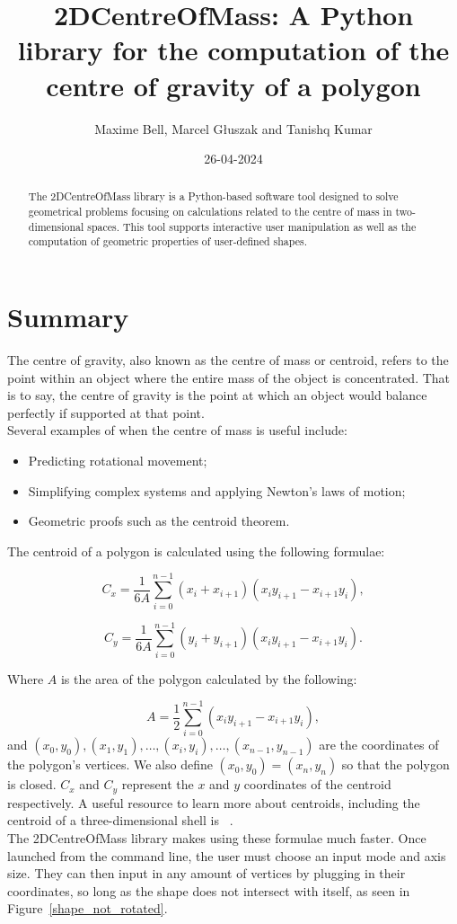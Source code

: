 \documentclass{article}
\title{2DCentreOfMass: A Python library for the computation of the centre of gravity of a polygon}
\author{Maxime Bell, Marcel Głuszak and Tanishq Kumar}
\date{26-04-2024}
\begin{document}
\maketitle

\begin{abstract}
    The 2DCentreOfMass library is a Python-based software tool designed to solve geometrical problems focusing on calculations related to the centre of mass in two-dimensional spaces. This tool supports interactive user manipulation as well as the computation of geometric properties of user-defined shapes. 
\end{abstract}

\section{Summary}
The centre of gravity, also known as the centre of mass or centroid, refers to the point within an object where the entire mass of the object is concentrated. That is to say, the centre of gravity is the point at which an object would balance perfectly if supported at that point.\\
Several examples of when the centre of mass is useful include:

\begin{itemize}
    \item Predicting rotational movement;
    \item Simplifying complex systems and applying Newton's laws of motion;
    \item Geometric proofs such as the centroid theorem.
\end{itemize}

The centroid of a polygon is calculated using the following formulae:

\[
C_x = \frac{1}{6A} \sum_{i=0}^{n-1} (x_i + x_{i+1})(x_i y_{i+1} - x_{i+1} y_i),
\]

\[
C_y = \frac{1}{6A} \sum_{i=0}^{n-1} (y_i + y_{i+1})(x_i y_{i+1} - x_{i+1} y_i).
\]

Where \(A\) is the area of the polygon calculated by the following:

\[
A = \frac{1}{2} \sum_{i=0}^{n-1} (x_i y_{i+1} - x_{i+1} y_i),
\]
 and
\(
(x_0,y_0), 
(x_1, y_1), 
\ldots, 
(x_i,y_i), 
\ldots,
(x_{n-1},y_{n-1})\) are the coordinates of the polygon's vertices. We also define \((x_0, y_0) = (x_n,y_n)\) so that the polygon is closed. \(C_x\) and \(C_y\) represent the \(x\) and \(y\) coordinates of the centroid respectively. A useful resource to learn more about centroids, including the centroid of a three-dimensional shell is ~\cite{bourke1988calculating}.\\
The 2DCentreOfMass library makes using these formulae much faster. Once launched from the command line, the user must choose an input mode and axis size. They can then input in any amount of vertices by plugging in their coordinates, so long as the shape does not intersect with itself, as seen in Figure~\ref{shape_not_rotated}.
\end{document}
